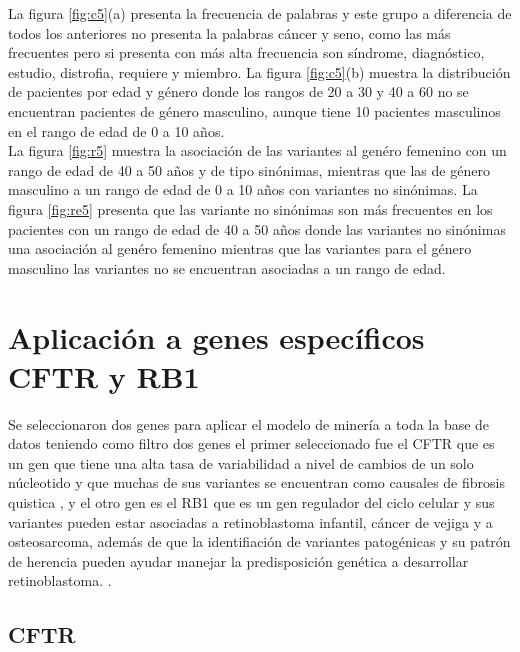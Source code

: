 La figura \ref{fig:c5}(a) presenta la frecuencia de palabras y este grupo a diferencia de todos los anteriores no presenta la palabras cáncer y seno, como las más frecuentes pero si presenta con más alta frecuencia son síndrome, diagnóstico, estudio, distrofia, requiere y miembro. La figura \ref{fig:c5}(b) muestra la distribución de pacientes por edad y género donde los rangos de 20 a 30 y 40 a 60 no se encuentran pacientes de género masculino, aunque tiene 10 pacientes masculinos en el rango de edad de 0 a 10 años. \\


La figura \ref{fig:r5} muestra la asociación de las variantes al genéro femenino con un rango de edad de 40 a 50 años y de tipo sinónimas, mientras que las de género masculino  a un rango de edad de 0 a 10 años con variantes no sinónimas. La figura \ref{fig:re5} presenta que las variante no sinónimas son más frecuentes en los pacientes con un rango de edad de 40 a 50 años donde las variantes no sinónimas una asociación al genéro femenino mientras que las variantes para el género masculino las variantes no se encuentran asociadas a un rango de edad. 


\section{Aplicación a genes específicos CFTR y RB1}

Se seleccionaron dos genes para aplicar el modelo de minería a toda la base de datos teniendo como filtro dos genes el primer  seleccionado fue el  CFTR que es un gen que tiene una alta tasa de variabilidad a nivel de cambios de un solo núcleotido y que muchas de sus variantes se encuentran como causales de fibrosis quistica \cite{Rowntree2003,Terlizzi2017b,Farrell2016}, y el otro gen es el RB1 que es un gen regulador del ciclo celular y sus variantes pueden estar asociadas a retinoblastoma  infantil, cáncer de vejiga y a osteosarcoma, además de que la identifiación de variantes patogénicas y su patrón de herencia pueden ayudar manejar la predisposición genética a desarrollar retinoblastoma. \cite{Liu2016,Yousef2018}. \\

\subsection*{CFTR}

